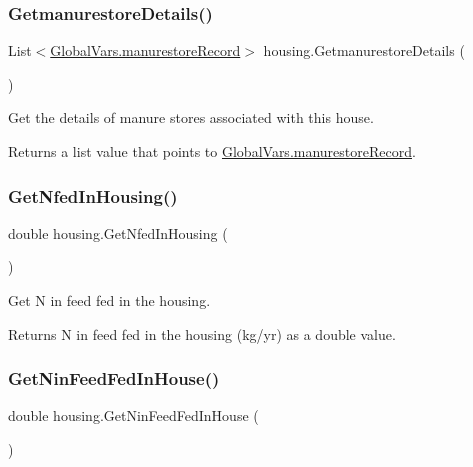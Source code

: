 \subsubsection{\texorpdfstring{GetmanurestoreDetails()}{GetmanurestoreDetails()}}
{\footnotesize\ttfamily List$<$\mbox{\hyperlink{struct_global_vars_1_1manurestore_record}{Global\+Vars.\+manurestore\+Record}}$>$ housing.\+Getmanurestore\+Details (\begin{DoxyParamCaption}{ }\end{DoxyParamCaption})\hspace{0.3cm}{\ttfamily [inline]}}



Get the details of manure stores associated with this house. 

\begin{DoxyReturn}{Returns}
a list value that points to \mbox{\hyperlink{struct_global_vars_1_1manurestore_record}{Global\+Vars.\+manurestore\+Record}}. 
\end{DoxyReturn}
\mbox{\label{classhousing_a5b879d4a3c6633d648bf5194fb9c6c49}} 
\subsubsection{\texorpdfstring{GetNfedInHousing()}{GetNfedInHousing()}}
{\footnotesize\ttfamily double housing.\+Get\+Nfed\+In\+Housing (\begin{DoxyParamCaption}{ }\end{DoxyParamCaption})\hspace{0.3cm}{\ttfamily [inline]}}



Get N in feed fed in the housing. 

\begin{DoxyReturn}{Returns}
N in feed fed in the housing (kg/yr) as a double value. 
\end{DoxyReturn}
\mbox{\label{classhousing_af8d0876ee58aa70abc1177d6696a702f}} 
\subsubsection{\texorpdfstring{GetNinFeedFedInHouse()}{GetNinFeedFedInHouse()}}
{\footnotesize\ttfamily double housing.\+Get\+Nin\+Feed\+Fed\+In\+House (\begin{DoxyParamCaption}{ }\end{DoxyParamCaption})\hspace{0.3cm}{\ttfamily [inline]}}



